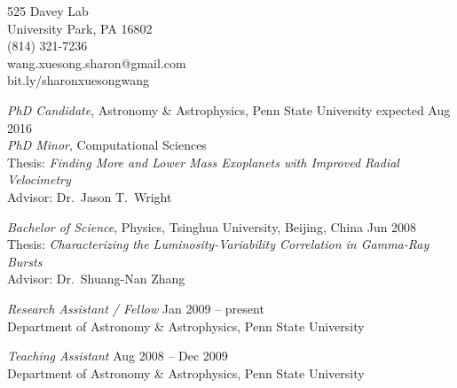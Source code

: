 

\begin{small}

\begin{center}
525 Davey Lab\\
University Park, PA 16802\\
(814) 321-7236\\
wang.xuesong.sharon@gmail.com\\
bit.ly/sharonxuesongwang\\


\end{center}
\smallskip




{\sl PhD Candidate}, Astronomy \& Astrophysics, Penn State University
\hfill expected Aug 2016 \\
{\sl PhD Minor}, Computational Sciences\\
Thesis: \textit{Finding More and Lower Mass Exoplanets with Improved
  Radial Velocimetry}\\ 
Advisor: Dr.\ Jason T.\ Wright
\vspace{10pt}

{\sl Bachelor of Science}, Physics, Tsinghua University, Beijing,
China \hfill Jun 2008 \\
Thesis: \textit{Characterizing the Luminosity-Variability Correlation
  in Gamma-Ray Bursts}\\
Advisor: Dr.\ Shuang-Nan Zhang






{\sl Research Assistant / Fellow} \hfill        Jan 2009 -- present  \\
Department of Astronomy \& Astrophysics, Penn State University

\vspace{10pt}   
   
{\sl Teaching Assistant} \hfill       Aug 2008 -- Dec 2009 \\
Department of Astronomy \& Astrophysics, Penn State University
   



\end{small}
